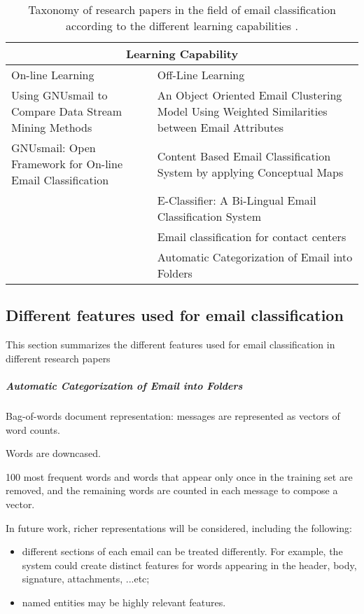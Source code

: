 \begin{center}
  \begin{table}[H]
    \begin{tabular}{|p{6cm}|p{6cm}|}
      \hline
      \multicolumn{2}{|c|}{Learning Capability} \\
      \hline
      On-line Learning & Off-Line Learning 
      \\ \hline
      Using GNUsmail to Compare Data Stream Mining Methods \cite{JOSE11} &
      An Object Oriented Email Clustering Model Using  Weighted Similarities 
      between Email Attributes \cite{NARESH10}
      \\ \hline
      GNUsmail: Open Framework for On-line Email Classification \cite{MANUEL11}
      & Content Based Email Classification System by applying Conceptual Maps \cite{BASKARAN09}
      \\ \hline
      & E-Classifier: A Bi-Lingual Email Classification System \cite{NOUF08}
      \\ \hline
      & Email classification for contact centers \cite{ANI03}
      \\ \hline
      & 
      Automatic Categorization of Email into Folders \cite{RON04}
      \\ \hline
    \end{tabular}
    \caption{Taxonomy of research papers in the field of email classification 
    according to the different learning capabilities .}
  \end{table}
\end{center}



\subsection{Different features used for email classification}
This section summarizes the different features used for email classification 
in different research papers
\subparagraph{Automatic Categorization of Email into Folders \cite{RON04}}
\begin{my_itemize}
  \item Bag-of-words document representation: messages are represented as 
  vectors of word counts.
  \item Words are downcased.
  \item 100 most frequent words and words that appear only once in the training 
  set are removed, and the remaining words are counted in each message to compose a vector.
  \item In future work, richer representations will be considered, including the following:
    \begin{itemize}
      \item different sections of each email can be treated differently. For example, 
      the system could create distinct features for words appearing in the header, 
      body, signature, attachments, ...etc;
      \item named entities may be highly relevant features.
    \end{itemize}
\end{my_itemize}

